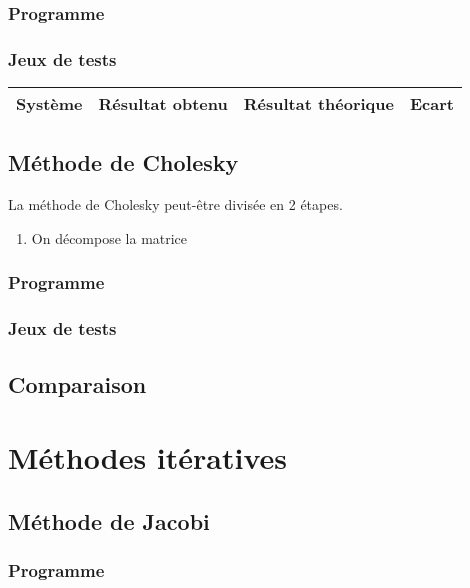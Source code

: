 \documentclass{report}
\begin{document}
      \subsection{Programme}
        
      \newpage
      \subsection{Jeux de tests}
        \begin{tabular}{|c|c|c|c|}
           \hline
           Système & Résultat obtenu & Résultat théorique & Ecart \\ %
           \hline
         \end{tabular}
        
        
    \newpage
    \section{Méthode de Cholesky}
      La méthode de Cholesky peut-être divisée en 2 étapes.
      \begin{enumerate}
        \item{On décompose la matrice}
      \end{enumerate}
      \subsection{Programme}
        
      \newpage
      \subsection{Jeux de tests}
      	
    \newpage
    \section{Comparaison}
    \newpage
     
  \chapter{Méthodes itératives}
  	\section{Méthode de Jacobi}
  	  \subsection{Programme}
        
      \newpage
\end{document}
